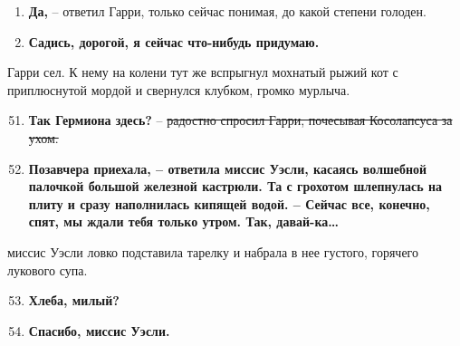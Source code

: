 \documentclass[12pt]{article}
\begin{document}
\begin{flushleft}
{\begin{minipage}[0]{540pt}
\begin{enumerate}
\vspace*{-10pt}\item
\textbf{Да,} – ответил Гарри, только сейчас понимая, до какой степени голоден.
\vspace*{-10pt}\item
\textbf{Садись, дорогой, я сейчас что-нибудь придумаю.}
\end{enumerate}
\vspace*{-10pt}\hspace{1.5mm}
Гарри сел. К нему на колени тут же вспрыгнул мохнатый рыжий кот с приплюснутой мордой и свернулся клубком, громко мурлыча.
\begin{enumerate}
\setcounter{enumi}{50}
\vspace*{-10pt}\item
\textbf{Так Гермиона здесь?} – \sout {радостно спросил Гарри, почесывая Косолапсуса за ухом.}




\vspace*{-10pt}\item
\textbf{Позавчера приехала, \textnormal{– ответила миссис Уэсли, касаясь волшебной палочкой большой железной кастрюли. Та с грохотом шлепнулась на плиту и сразу наполнилась кипящей водой. –} Сейчас все, конечно, спят, мы ждали тебя только утром. Так, давай-ка…}
\end{enumerate}
\vspace*{-10pt}
\hspace{3mm}\makebox{\textbf{===================================================}} 
 миссис Уэсли ловко подставила тарелку и набрала в нее густого, горячего лукового супа.
\begin{enumerate}
\setcounter{enumi}{52}
\vspace*{-10pt}\item
\textbf{Хлеба, милый?}
\vspace*{-10pt}\item
\textbf{Спасибо, миссис Уэсли.}
\end{enumerate}



\end{minipage} 

}

\end{flushleft}
\end{document}

